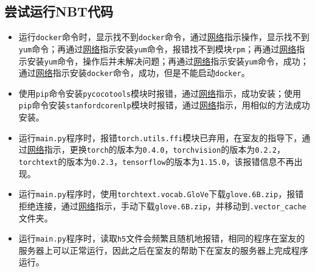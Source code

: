\documentclass[12pt]{article}
\begin{document}
\subsection{尝试运行NBT代码}

\begin{itemize}
\item 运行\verb|docker|命令时，显示找不到\verb|docker|命令，通过\href{https://cloud.tencent.com/developer/article/1605163}{网络}指示操作，显示找不到\verb|yum|命令；再通过\href{https://www.jianshu.com/p/d4a32d420525}{网络}指示安装\verb|yum|命令，报错找不到模块\verb|rpm|；再通过\href{https://blog.csdn.net/xTand/article/details/105710793}{网络}指示安装\verb|yum|命令，操作后并未解决问题；再通过\href{https://blog.csdn.net/weixin_44037416/article/details/102608113}{网络}指示安装\verb|yum|命令，成功；通过\href{https://www.linuxidc.com/Linux/2020-01/162075.htm#:~:text=Linux%20CentOS%207%20%E9%9D%9Eroot%E7%94%A8%E6%88%B7%E5%AE%89%E8%A3%85%E6%BA%90%E7%A0%81%E7%89%88Docker%201%201.%E6%9F%A5%E7%9C%8B%E5%BD%93%E5%89%8D%E4%B8%BB%E6%9C%BA%E6%98%AF%E5%90%A6%E6%9C%89docker%E7%BB%84%202%203.%E6%8A%8A%E5%BD%93%E5%89%8D%E7%94%A8%E6%88%B7%E5%8A%A0%E5%85%A5%E5%88%B0docker%E7%BB%84,%2Fusr%2Fb%20...%207%206.%E5%B0%86docker%E6%B3%A8%E5%86%8C%E4%B8%BAservice%E6%9C%8D%E5%8A%A1%208%207.%E6%B7%BB%E5%8A%A0%E6%89%A7%E8%A1%8C%E6%9D%83%E9%99%90%E5%B9%B6%E9%87%8D%E6%96%B0%E5%8A%A0%E8%BD%BD%E9%85%8D%E7%BD%AE%E6%96%87%E4%BB%B6%209%209.%E5%90%AF%E5%8A%A8docker}{网络}指示安装\verb|docker|命令，成功，但是不能启动\verb|docker|。
\item 使用\verb|pip|命令安装\verb|pycocotools|模块时报错，通过\href{https://blog.csdn.net/weixin_42840933/article/details/85308265}{网络}指示，成功安装；使用\verb|pip|命令安装\verb|stanfordcorenlp|模块时报错，通过\href{https://blog.csdn.net/maxMikexu/article/details/105459045}{网络}指示，用相似的方法成功安装。
\item 运行\verb|main.py|程序时，报错\verb|torch.utils.ffi|模块已弃用，在室友的指导下，通过\href{https://blog.csdn.net/qq_45750017/article/details/118997481}{网络}指示，更换\verb|torch|的版本为\verb|0.4.0|，\verb|torchvision|的版本为\verb|0.2.2|，\verb|torchtext|的版本为\verb|0.2.3|，\verb|tensorflow|的版本为\verb|1.15.0|，该报错信息不再出现。
\item 运行\verb|main.py|程序时，使用\verb|torchtext.vocab.GloVe|下载\verb|glove.6B.zip|，报错拒绝连接，通过\href{https://blog.csdn.net/weixin_56915683/article/details/118000821}{网络}指示，手动下载\verb|glove.6B.zip|，并移动到\verb|.vector_cache|文件夹。
\item 运行\verb|main.py|程序时，读取\verb|h5|文件会频繁且随机地报错，相同的程序在室友的服务器上可以正常运行，因此之后在室友的帮助下在室友的服务器上完成程序运行。
\end{itemize}
\end{document}
